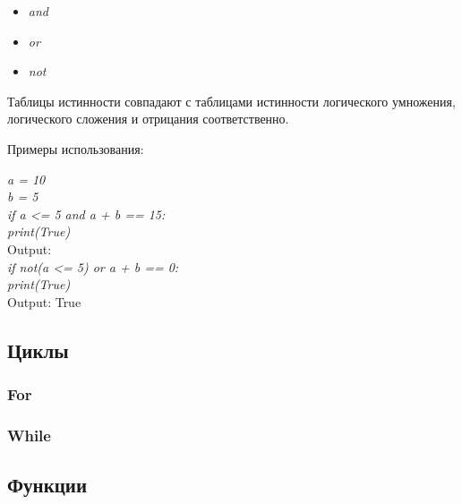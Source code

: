 \begin{itemize}
	\setlength\itemsep{0.1em}
	\item \textit{and}
	\item \textit{or}
	\item \textit{not}
\end{itemize}

Таблицы истинности совпадают с таблицами истинности логического умножения, логического сложения и отрицания соответственно.

Примеры использования:

\begin{flushleft}
	\colorbox[rgb]{0.95, 0.95, 0.95}{\textit{a = 10}} \\
	\colorbox[rgb]{0.95, 0.95, 0.95}{\textit{b = 5}} \\
	\colorbox[rgb]{0.95, 0.95, 0.95}{\textit{if a <= 5 and a + b == 15:}} \\
	\colorbox[rgb]{0.95, 0.95, 0.95}{\hspace{1cm} \textit{print(True)}} \\
	\colorbox[rgb]{0.95, 0.95, 0.95}{Output:} \\
	\vspace{1cm}
	\colorbox[rgb]{0.95, 0.95, 0.95}{\textit{if not(a <= 5) or a + b == 0:}} \\
	\colorbox[rgb]{0.95, 0.95, 0.95}{\hspace{1cm} \textit{print(True)}} \\
	\colorbox[rgb]{0.95, 0.95, 0.95}{Output: True} \\
	
\end{flushleft}


\newpage
\subsection{Циклы}

\subsubsection{For}

\subsubsection{While}

\newpage
\subsection{Функции}

\newpage
